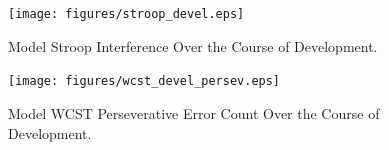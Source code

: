 \begin{figure}[t]
\begin{center}
	\texttt{[image: figures/stroop\_devel.eps]}
\end{center}
\caption{Model Stroop Interference Over the Course of Development.} 
\label{stroop-devel-figure}
\end{figure} 

\begin{figure}[t]
\begin{center}
	\texttt{[image: figures/wcst\_devel\_persev.eps]}
\end{center}
\caption{Model WCST Perseverative Error Count Over the Course of Development.} 
\label{wcst-devel-figure}
\end{figure} 

